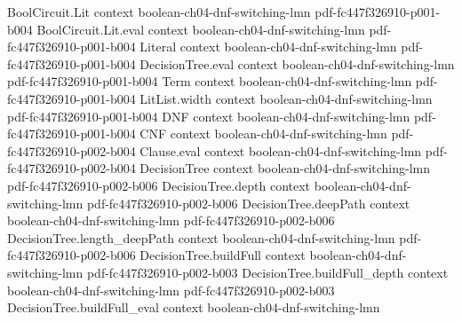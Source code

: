 \begin{theorem}
\label{LMN.layer2_cnf_replaceability_union_bound}
\leanok
{}
\proofstep
  {BoolCircuit.Lit}
  {context}
  {boolean-ch04-dnf-switching-lmn}
  {pdf-fc447f326910-p001-b004}
\proofstep
  {BoolCircuit.Lit.eval}
  {context}
  {boolean-ch04-dnf-switching-lmn}
  {pdf-fc447f326910-p001-b004}
\proofstep
  {Literal}
  {context}
  {boolean-ch04-dnf-switching-lmn}
  {pdf-fc447f326910-p001-b004}
\proofstep
  {DecisionTree.eval}
  {context}
  {boolean-ch04-dnf-switching-lmn}
  {pdf-fc447f326910-p001-b004}
\proofstep
  {Term}
  {context}
  {boolean-ch04-dnf-switching-lmn}
  {pdf-fc447f326910-p001-b004}
\proofstep
  {LitList.width}
  {context}
  {boolean-ch04-dnf-switching-lmn}
  {pdf-fc447f326910-p001-b004}
\proofstep
  {DNF}
  {context}
  {boolean-ch04-dnf-switching-lmn}
  {pdf-fc447f326910-p001-b004}
\proofstep
  {CNF}
  {context}
  {boolean-ch04-dnf-switching-lmn}
  {pdf-fc447f326910-p002-b004}
\proofstep
  {Clause.eval}
  {context}
  {boolean-ch04-dnf-switching-lmn}
  {pdf-fc447f326910-p002-b004}
\proofstep
  {DecisionTree}
  {context}
  {boolean-ch04-dnf-switching-lmn}
  {pdf-fc447f326910-p002-b006}
\proofstep
  {DecisionTree.depth}
  {context}
  {boolean-ch04-dnf-switching-lmn}
  {pdf-fc447f326910-p002-b006}
\proofstep
  {DecisionTree.deepPath}
  {context}
  {boolean-ch04-dnf-switching-lmn}
  {pdf-fc447f326910-p002-b006}
\proofstep
  {DecisionTree.length_deepPath}
  {context}
  {boolean-ch04-dnf-switching-lmn}
  {pdf-fc447f326910-p002-b006}
\proofstep
  {DecisionTree.buildFull}
  {context}
  {boolean-ch04-dnf-switching-lmn}
  {pdf-fc447f326910-p002-b003}
\proofstep
  {DecisionTree.buildFull_depth}
  {context}
  {boolean-ch04-dnf-switching-lmn}
  {pdf-fc447f326910-p002-b003}
\proofstep
  {DecisionTree.buildFull_eval}
  {context}
  {boolean-ch04-dnf-switching-lmn}

\end{theorem}
